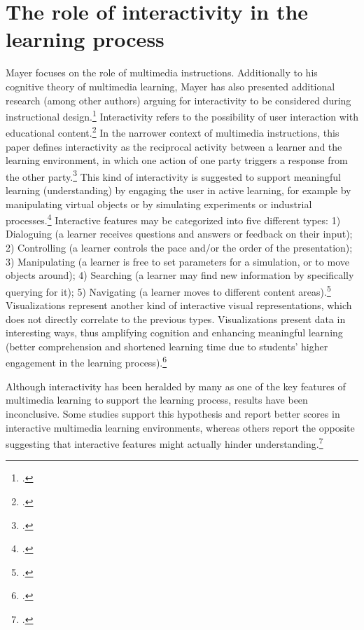 \section{The role of interactivity in the learning process} \label{sec:Interactivity}
Mayer focuses on the role of multimedia instructions. Additionally to his cognitive theory of multimedia learning, Mayer has also presented additional research (among other authors) arguing for interactivity to be considered during instructional design.\footcites[Cf.][chapter 2, paragraph 12]{ClarkElearningscienceinstruction2016} Interactivity refers to the possibility of user interaction with educational content.\footcites[Cf.][p.292]{PatwardhanWhendoeshigher2015} In the narrower context of multimedia instructions, this paper defines interactivity as the reciprocal activity between a learner and the learning environment, in which one action of one party triggers a response from the other party.\footcites[Cf.][p.1025]{DomagkInteractivitymultimedialearning2010} This kind of interactivity is suggested to support meaningful learning (understanding) by engaging the user in active learning, for example by manipulating virtual objects or by simulating experiments or industrial processes.\footcites[Cf.][p.161]{CairncrossInteractiveMultimediaLearning2001}[cf.][p.1159]{Evansinteractivityeffectmultimedia2007} Interactive features may be categorized into five different types: 1) Dialoguing (a learner receives questions and answers or feedback on their input); 2) Controlling (a learner controls the pace and/or the order of the presentation); 3) Manipulating (a learner is free to set parameters for a simulation, or to move objects around); 4) Searching (a learner may find new information by specifically querying for it); 5) Navigating (a learner moves to different content areas).\footcites[Cf.][p.311]{MorenoInteractiveMultimodalLearning2007} Visualizations represent another kind of interactive visual representations, which does not directly correlate to the previous types. Visualizations present data in interesting ways, thus amplifying cognition and enhancing meaningful learning (better comprehension and shortened learning time due to students' higher engagement in the learning process).\footcites[Cf.][p.294]{PatwardhanWhendoeshigher2015} 

Although interactivity has been heralded by many as one of the key features of multimedia learning to support the learning process, results have been inconclusive. Some studies support this hypothesis and report better scores in interactive multimedia learning environments, whereas others report the opposite suggesting that interactive features might actually hinder understanding.\footcites[Cf.][p.1024]{DomagkInteractivitymultimedialearning2010}[cf.][]{MayerWhenLearningJust2001}[cf.][p.156]{CairncrossInteractiveMultimediaLearning2001}[cf.][pp. 1148 et seq]{Evansinteractivityeffectmultimedia2007}[cf.][p.48]{SordenCognitiveTheoryMultimedia2012}

